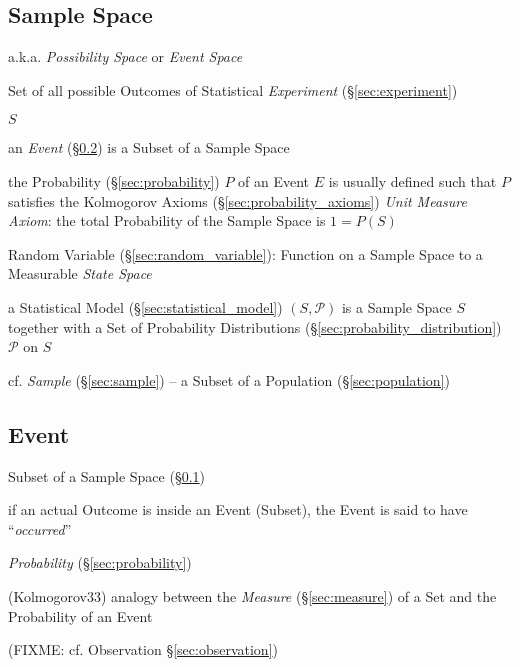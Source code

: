 \subsection{Sample Space}\label{sec:sample_space}

a.k.a. \emph{Possibility Space} or \emph{Event Space}

Set of all possible Outcomes of Statistical \emph{Experiment}
(\S\ref{sec:experiment})

$S$

an \emph{Event} (\S\ref{sec:probability_event}) is a Subset of a Sample Space

the Probability (\S\ref{sec:probability}) $P$ of an Event $E$ is usually defined
such that $P$ satisfies the Kolmogorov Axioms (\S\ref{sec:probability_axioms})
\fist \emph{Unit Measure Axiom}: the total Probability of the Sample Space is
$1 = P(S)$

Random Variable (\S\ref{sec:random_variable}): Function on a Sample Space to a
Measurable \emph{State Space}

a Statistical Model (\S\ref{sec:statistical_model}) $(S,\mathcal{P})$ is a
Sample Space $S$ together with a Set of Probability Distributions
(\S\ref{sec:probability_distribution}) $\mathcal{P}$ on $S$

\fist cf. \emph{Sample} (\S\ref{sec:sample}) -- a Subset of a Population
(\S\ref{sec:population})



\subsection{Event}\label{sec:probability_event}

Subset of a Sample Space (\S\ref{sec:sample_space})

if an actual Outcome is inside an Event (Subset), the Event is said to have
``\emph{occurred}''

\emph{Probability} (\S\ref{sec:probability})

(Kolmogorov33) analogy between the \emph{Measure} (\S\ref{sec:measure}) of a Set
and the Probability of an Event

(FIXME: cf. Observation \S\ref{sec:observation})

